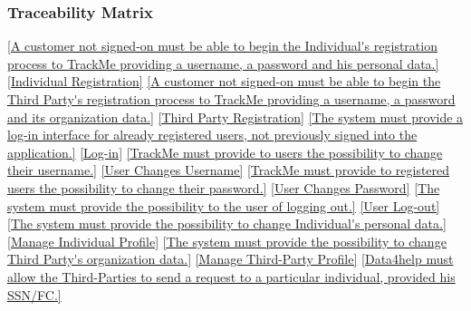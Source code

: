 \documentclass[a4paper]{article}
\begin{document}
        \subsubsection{Traceability Matrix}
        \begin{traceabilitymatrix}
            \con{\ref{Allow a Guest to register as an Individual.}}
                {\ref{A customer not signed-on must be able to begin the Individual's registration process to TrackMe providing a username, a password and his personal data.}}
                {\ref{Individual Registration}}
                {}
            \con{\ref{Allow a Guest to register as a Third-Party.}}
                {\ref{A customer not signed-on must be able to begin the Third Party's registration process to TrackMe providing a username, a password and its organization data.}}
                {\ref{Third Party Registration}}
                {}
            \con{\ref{The Guest should be able to sign in into the application.}}
                {\ref{The system must provide a log-in interface for already registered users, not previously signed into the application.}}
                {\ref{Log-in}}
                {}
            \con{\ref{The User should be able to change his credentials.}}
                {\ref{TrackMe must provide to users the possibility to change their username.}}
                {\ref{User Changes Username}}
                {}
            \con{\ref{The User should be able to change his credentials.}}
                {\ref{TrackMe must provide to registered users the possibility to change their password.}}
                {\ref{User Changes Password}}
                {}
            \con{\ref{The User should be able to log-out from the system.}}
                {\ref{The system must provide the possibility to the user of logging out.}}
                {\ref{User Log-out}}
                {}
            \con{\ref{The Individual should be able to change his personal data.}}
                {\ref{The system must provide the possibility to change Individual's personal data.}}
                {\ref{Manage Individual Profile}}
                {}
            \con{\ref{The Third-Party should be able to change his organization data.}}
                {\ref{The system must provide the possibility to change Third Party's organization data.}}
                {\ref{Manage Third-Party Profile}}
                {}
            \con{\ref{The Third-Party should be able to send requests to the Individuals.}}
                {\ref{Data4help must allow the Third-Parties to send a request to a particular individual, provided his SSN/FC.}}

\end{traceabilitymatrix}
\end{document}
